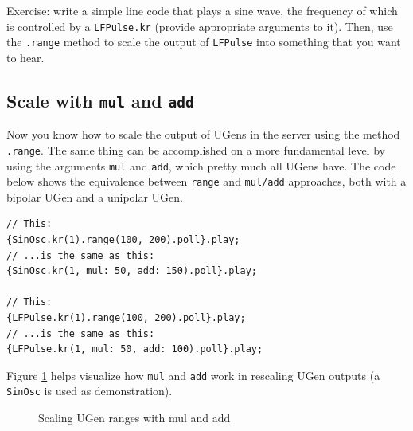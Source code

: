 Exercise: write a simple line code that plays a sine wave, the frequency of which is controlled by a \texttt{LFPulse.kr} (provide appropriate arguments to it). Then, use the \texttt{.range} method to scale the output of \texttt{LFPulse} into something that you want to hear. 

\subsection{Scale with \texttt{mul} and \texttt{add}}

Now you know how to scale the output of UGens in the server using the method \texttt{.range}. The same thing can be accomplished on a more fundamental level by using the arguments \texttt{mul} and \texttt{add}, which pretty much all UGens have. The code below shows the equivalence between \texttt{range} and \texttt{mul/add} approaches, both with a bipolar UGen and a unipolar UGen.

\begin{lstlisting}[style=SuperCollider-IDE, basicstyle=\scttfamily\footnotesize]
// This:
{SinOsc.kr(1).range(100, 200).poll}.play;
// ...is the same as this:
{SinOsc.kr(1, mul: 50, add: 150).poll}.play;

// This:
{LFPulse.kr(1).range(100, 200).poll}.play;
// ...is the same as this:
{LFPulse.kr(1, mul: 50, add: 100).poll}.play;
\end{lstlisting}

Figure \ref{fig:mul-add-scale} helps visualize how \texttt{mul} and \texttt{add} work in rescaling UGen outputs (a \texttt{SinOsc} is used as demonstration).

\begin{figure}[h!]
\centerline{}
\caption{Scaling UGen ranges with mul and add}
\label{fig:mul-add-scale}
\end{figure}

